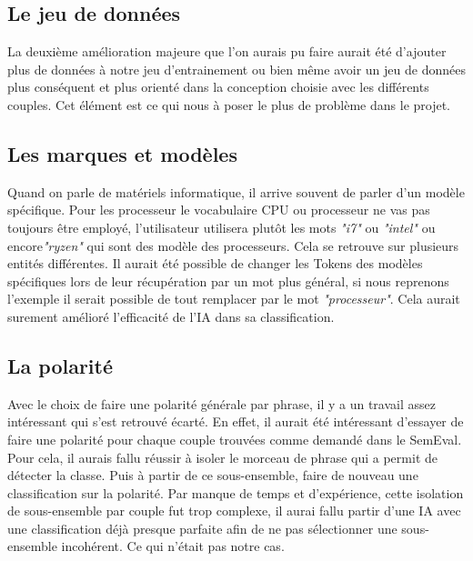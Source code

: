 \documentclass[12pt ,a4paper ]{article}
\begin{document}
\begin{multicols}{2}
\subsection{Le jeu de données}
La deuxième amélioration majeure que l'on aurais pu faire aurait été d'ajouter plus de données à notre jeu d'entrainement ou bien même avoir un jeu de données plus conséquent et plus orienté dans la conception choisie avec les différents couples. Cet élément est ce qui nous à poser le plus de problème dans le projet.

\subsection{Les marques et modèles}
Quand on parle de matériels informatique, il arrive souvent de parler d'un modèle spécifique. Pour les processeur le vocabulaire CPU ou processeur ne vas pas toujours être employé, l'utilisateur utilisera plutôt les mots \textit{"i7"} ou \textit{"intel"} ou encore\textit{"ryzen"} qui sont des modèle des processeurs. Cela se retrouve sur plusieurs entités différentes. Il aurait été possible de changer les Tokens des modèles spécifiques lors de leur récupération par un mot plus général, si nous reprenons l'exemple il serait possible de tout remplacer par le mot \textit{"processeur"}. Cela aurait surement amélioré l'efficacité de l'IA dans sa classification.

\subsection{La polarité}
Avec le choix de faire une polarité générale par phrase, il y a un travail assez intéressant qui s'est retrouvé écarté. En effet, il aurait été intéressant d'essayer de faire une polarité pour chaque couple trouvées comme demandé dans le SemEval. Pour cela, il aurais fallu réussir à isoler le morceau de phrase qui a permit de détecter la classe. Puis à partir de ce sous-ensemble, faire de nouveau une classification sur la polarité. Par manque de temps et d'expérience, cette isolation de sous-ensemble par couple fut trop complexe, il aurai fallu partir d'une IA avec une classification déjà presque parfaite afin de ne pas sélectionner une sous-ensemble incohérent. Ce qui n'était pas notre cas. 

\end{multicols}
\newpage
\end{document}
